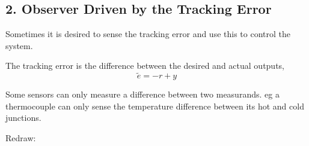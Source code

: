 


 
\subsection*{2. Observer Driven by the Tracking Error
} %
\label{sub:2_observer_driven_by_the_tracking_error_}

Sometimes it is desired to sense the tracking error and use this to control the system.

The tracking error is the difference between the desired and actual outputs,
\[
\tilde e =  - r + y
\]

 
Some sensors can only measure a difference between two measurands. eg  a thermocouple can only sense the temperature difference between its hot and cold junctions.
\begin{center}
\end{center}
Redraw:
\begin{center}
\end{center}

